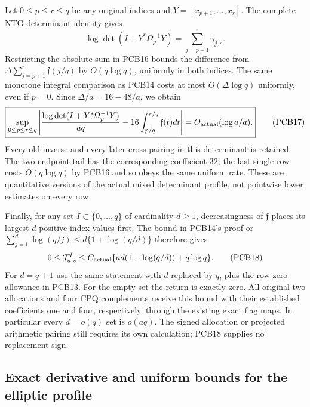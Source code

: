 \documentclass[11pt,a4paper]{article}
\begin{document}
Let $0\le p\le r\le q$ be any original indices and
$Y=[x_{p+1},\ldots,x_r]$. The complete NTG determinant identity gives
\[
 \log\det(I+Y^*\Omega_p^{-1}Y)
      =\sum_{j=p+1}^{r}\gamma_{j,s}.
\]
Restricting the absolute sum in PCB16 bounds the difference from
$\Delta\sum_{j=p+1}^r\mathfrak f(j/q)$ by $O(q\log q)$,
uniformly in both indices. The same monotone integral comparison as PCB14
costs at most $O(\Delta\log q)$ uniformly, even if $p=0$.
Since $\Delta/a=16-48/a$, we obtain
\[
 \boxed{\sup_{0\le p\le r\le q}
 \left|\frac{\log\det(I+Y^*\Omega_p^{-1}Y)}{aq}
       -16\int_{p/q}^{r/q}\mathfrak f(t)dt\right|
       =O_{\rm actual}(\log a/a).}
 \tag{PCB17}
\]
Every old inverse and every later cross pairing in this determinant is
retained. The two-endpoint tail has the corresponding coefficient $32$;
the last single row costs $O(q\log q)$ by PCB16 and so obeys the same
uniform rate. These are quantitative versions of the actual mixed
determinant profile, not pointwise lower estimates on every row.

Finally, for any set $I\subset\{0,\ldots,q\}$ of cardinality $d\ge1$,
decreasingness of $\mathfrak f$ places its largest $d$ positive-index
values first. The bound in PCB14's proof or
$\sum_{j=1}^d\log(q/j)\le d\{1+\log(q/d)\}$ therefore gives
\[
 0\le\mathcal T^I_{a,s}
    \le C_{\rm actual}\{ad(1+\log(q/d))+q\log q\}.
 \tag{PCB18}
\]
For $d=q+1$ use the same statement with $d$ replaced by $q$, plus the
row-zero allowance in PCB13. For the empty set the return is exactly zero.
All original two allocations and four CPQ complements receive this bound
with their established coefficients one and four, respectively, through
the existing exact flag maps. In particular every $d=o(q)$ set is
$o(aq)$. The signed allocation or projected arithmetic pairing still
requires its own calculation; PCB18 supplies no replacement sign.
\endgroup


\subsection{Exact derivative and uniform bounds for the elliptic profile}
\end{document}
